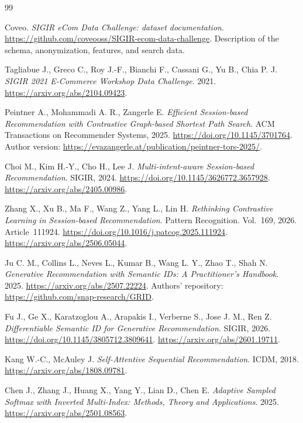 \documentclass[12pt,a4paper]{article}
\theoremstyle{plainru}
\begin{document}
\begingroup
\small
\setlength{\parskip}{0pt}
\begin{thebibliography}{99}
\setlength{\itemsep}{0.3\baselineskip}

Coveo. \emph{SIGIR eCom Data Challenge: dataset documentation}.
\url{https://github.com/coveooss/SIGIR-ecom-data-challenge}.
Description of the schema, anonymization, features, and search data.

Tagliabue J., Greco C., Roy J.-F., Bianchi F., Cassani G., Yu B., Chia P. J.
\emph{SIGIR 2021 E-Commerce Workshop Data Challenge}.
2021. \url{https://arxiv.org/abs/2104.09423}.

Peintner A., Mohammadi A. R., Zangerle E.
\emph{Efficient Session-based Recommendation with Contrastive
Graph-based Shortest Path Search}.
ACM Transactions on Recommender Systems, 2025.
\url{https://doi.org/10.1145/3701764}.
Author version:
\url{https://evazangerle.at/publication/peintner-tors-2025/}.

Choi M., Kim H.-Y., Cho H., Lee J.
\emph{Multi-intent-aware Session-based Recommendation}.
SIGIR, 2024. \url{https://doi.org/10.1145/3626772.3657928}.
\url{https://arxiv.org/abs/2405.00986}.

Zhang X., Xu B., Ma F., Wang Z., Yang L., Lin H.
\emph{Rethinking Contrastive Learning in Session-based Recommendation}.
Pattern Recognition. Vol.~169, 2026. Article~111924.
\url{https://doi.org/10.1016/j.patcog.2025.111924}.
\url{https://arxiv.org/abs/2506.05044}.

Ju C. M., Collins L., Neves L., Kumar B., Wang L. Y., Zhao T., Shah N.
\emph{Generative Recommendation with Semantic IDs: A Practitioner's Handbook}.
2025. \url{https://arxiv.org/abs/2507.22224}.
Authors' repository: \url{https://github.com/snap-research/GRID}.

Fu J., Ge X., Karatzoglou A., Arapakis I., Verberne S., Jose J. M., Ren Z.
\emph{Differentiable Semantic ID for Generative Recommendation}.
SIGIR, 2026. \url{https://doi.org/10.1145/3805712.3809641}.
\url{https://arxiv.org/abs/2601.19711}.

Kang W.-C., McAuley J.
\emph{Self-Attentive Sequential Recommendation}.
ICDM, 2018. \url{https://arxiv.org/abs/1808.09781}.

Chen J., Zhang J., Huang X., Yang Y., Lian D., Chen E.
\emph{Adaptive Sampled Softmax with Inverted Multi-Index:
Methods, Theory and Applications}.
2025. \url{https://arxiv.org/abs/2501.08563}.


\end{thebibliography}
\end{document}
